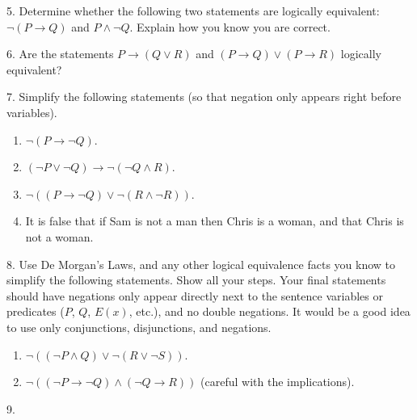 \documentclass[12pt,]{book}
\theoremstyle{plain}
\theoremstyle{definition}
\theoremstyle{definition}
\theoremstyle{definition}
\numberwithin{equation}{chapter}
\newcommand{\imp}{\rightarrow}
\begin{document}
\begin{exerciselist}
\item[5.]\hypertarget{exercise-145}{}\hypertarget{p-1276}{}%
Determine whether the following two statements are logically equivalent:  \(\neg(P \imp Q)\) and \(P \wedge \neg Q\). Explain how you know you are correct.%
\par\smallskip
\item[6.]\hypertarget{exercise-146}{}\hypertarget{p-1278}{}%
Are the statements \(P \imp (Q\vee R)\) and \((P \imp Q) \vee (P \imp R)\) logically equivalent?%
\par\smallskip
\item[7.]\hypertarget{exercise-147}{}\hypertarget{p-1279}{}%
Simplify the following statements (so that negation only appears right before variables).%
\par
\hypertarget{p-1280}{}%
\leavevmode%
\begin{enumerate}[label=(\alph*)]
\item\hypertarget{li-623}{}\(\neg(P \imp \neg Q)\).%
\item\hypertarget{li-624}{}\((\neg P \vee \neg Q) \imp \neg (\neg Q \wedge R)\).%
\item\hypertarget{li-625}{}\(\neg((P \imp \neg Q) \vee \neg (R \wedge \neg R))\).%
\item\hypertarget{li-626}{}\hypertarget{p-1281}{}%
It is false that if Sam is not a man then Chris is a woman, and that Chris is not a woman.%
\end{enumerate}
%
\par\smallskip
\item[8.]\hypertarget{exercise-148}{}\hypertarget{p-1285}{}%
Use De Morgan's Laws, and any other logical equivalence facts you know to simplify the following statements. Show all your steps. Your final statements should have negations only appear directly next to the sentence variables or predicates (\(P\), \(Q\), \(E(x)\), etc.), and no double negations. It would be a good idea to use only conjunctions, disjunctions, and negations.%
\par
\hypertarget{p-1286}{}%
\leavevmode%
\begin{enumerate}[label=(\alph*)]
\item\hypertarget{li-631}{}\(\neg((\neg P \wedge Q) \vee \neg(R \vee \neg S))\). %
\item\hypertarget{li-632}{}\(\neg((\neg P \imp \neg Q) \wedge (\neg Q \imp R))\) (careful with the implications). %
\end{enumerate}
%
\par\smallskip
\item[9.]\hypertarget{exercise-149}{}\hypertarget{p-1287}{}%

\end{exerciselist}
\end{document}
